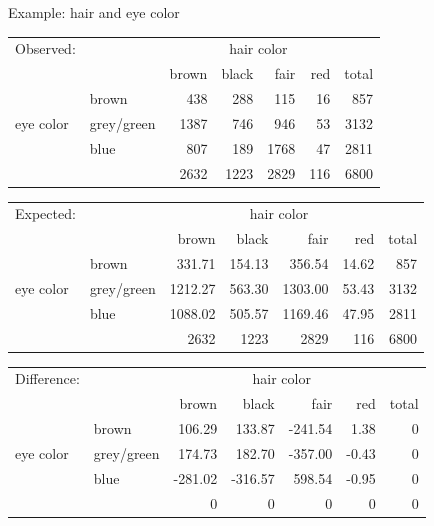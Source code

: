 \begin{frame}{Example: hair and eye color}

  \begin{center}
    \begin{tabular}{ll|rrrr|r}
  \alert{Observed:} & & & \multicolumn{2}{c}{hair color} & \\
      & & brown & black & fair & red  & total\\
      \hline
      & brown & 438 & 288 & 115 & 16 & 857 \\
      eye color & grey/green & 1387 & 746 & 946 & 53 & 3132 \\
      & blue & 807 & 189 & 1768 & 47 & 2811 \\
      \hline 
      & & 2632 & 1223 & 2829  & 116  & 6800 \\
    \end{tabular}
  \end{center}

  \begin{center}
    \begin{tabular}{ll|rrrr|r}
  \alert{Expected:} & & & \multicolumn{2}{c}{hair color} & \\
      & & brown & black & fair & red  & total\\
      \hline
                 & brown  & 331.71 & 154.13 & 356.54 & 14.62   & 857  \\ 
  eye color & grey/green  & 1212.27 & 563.30 & 1303.00 & 53.43 & 3132 \\ 
                  & blue  & 1088.02 & 505.57 & 1169.46 & 47.95 & 2811 \\ 
      \hline 
      & & 2632 & 1223 & 2829  & 116  & 6800 \\
    \end{tabular}
  \end{center}

  \begin{center}
    \begin{tabular}{ll|rrrr|r}
  \alert{Difference:} & & & \multicolumn{2}{c}{hair color} & \\
      & & brown & black & fair & red  & total\\
      \hline
                 & brown  & 106.29 & 133.87 & -241.54 & 1.38    & 0  \\ 
  eye color & grey/green  & 174.73 & 182.70 & -357.00 & -0.43   & 0 \\ 
                  & blue  & -281.02 & -316.57 & 598.54 & -0.95  & 0 \\ 
      \hline 
      & & 0 & 0 & 0  & 0 & 0 \\
    \end{tabular}
  \end{center}

  \begin{align*}
  \end{align*}

\end{frame}

